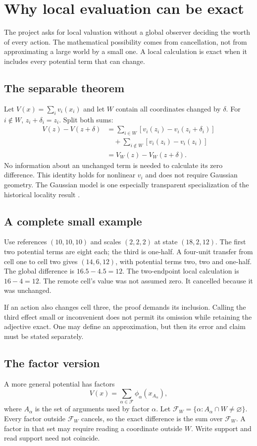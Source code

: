 \chapter{Why local evaluation can be exact}\label{ch:local}
The project asks for local valuation without a global observer deciding the
worth of every action. The mathematical possibility comes from cancellation,
not from approximating a large world by a small one. A local calculation is
exact when it includes every potential term that can change.

\section{The separable theorem}
Let $V(x)=\sum_i v_i(x_i)$ and let $W$ contain all coordinates changed by
$\delta$. For $i\notin W$, $z_i+\delta_i=z_i$. Split both sums:
\begin{align}
 V(z)-V(z+\delta)
 &=\sum_{i\in W}[v_i(z_i)-v_i(z_i+\delta_i)]\\
 &\quad+\sum_{i\notin W}[v_i(z_i)-v_i(z_i)]\\
 &=V_W(z)-V_W(z+\delta).
\end{align}
No information about an unchanged term is needed to calculate its zero
difference. This identity holds for nonlinear $v_i$ and does not require
Gaussian geometry. The Gaussian model is one especially transparent
specialization of the historical locality result \cite{foundation}.

\section{A complete small example}
Use references $(10,10,10)$ and scales $(2,2,2)$ at state $(18,2,12)$.
The first two potential terms are eight each; the third is one-half.
A four-unit transfer from cell one to cell two gives $(14,6,12)$, with
potential terms two, two and one-half. The global difference is
$16.5-4.5=12$. The two-endpoint local calculation is $16-4=12$.
The remote cell's value was not assumed zero. It cancelled because it
was unchanged.

If an action also changes cell three, the proof demands its inclusion.
Calling the third effect small or inconvenient does not permit its omission
while retaining the adjective exact. One may define an approximation, but
then its error and claim must be stated separately.

\section{The factor version}
A more general potential has factors
\begin{equation}
 V(x)=\sum_{\alpha\in\mathcal F}\phi_\alpha(x_{A_\alpha}),
\end{equation}
where $A_\alpha$ is the set of arguments used by factor $\alpha$. Let
$\mathcal F_W=\{\alpha:A_\alpha\cap W\ne\varnothing\}$.
Every factor outside $\mathcal F_W$ cancels, so the exact difference is
the sum over $\mathcal F_W$. A factor in that set may require reading a
coordinate outside $W$. Write support and read support need not coincide.

